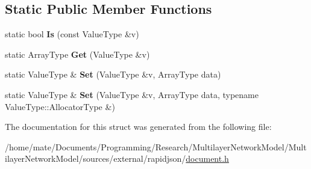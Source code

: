 \subsection*{Static Public Member Functions}
\begin{DoxyCompactItemize}
\item 
static bool {\bfseries Is} (const Value\+Type \&v)\hypertarget{structinternal_1_1TypeHelper_3_01ValueType_00_01typename_01ValueType_1_1Array_01_4_a2a052fc0139112075f8bade42964273d}{}\label{structinternal_1_1TypeHelper_3_01ValueType_00_01typename_01ValueType_1_1Array_01_4_a2a052fc0139112075f8bade42964273d}

\item 
static Array\+Type {\bfseries Get} (Value\+Type \&v)\hypertarget{structinternal_1_1TypeHelper_3_01ValueType_00_01typename_01ValueType_1_1Array_01_4_a0e6bd47ab5da0387bf419cdf644035ab}{}\label{structinternal_1_1TypeHelper_3_01ValueType_00_01typename_01ValueType_1_1Array_01_4_a0e6bd47ab5da0387bf419cdf644035ab}

\item 
static Value\+Type \& {\bfseries Set} (Value\+Type \&v, Array\+Type data)\hypertarget{structinternal_1_1TypeHelper_3_01ValueType_00_01typename_01ValueType_1_1Array_01_4_a7bab3fa93fb8bda16baf289e1d281315}{}\label{structinternal_1_1TypeHelper_3_01ValueType_00_01typename_01ValueType_1_1Array_01_4_a7bab3fa93fb8bda16baf289e1d281315}

\item 
static Value\+Type \& {\bfseries Set} (Value\+Type \&v, Array\+Type data, typename Value\+Type\+::\+Allocator\+Type \&)\hypertarget{structinternal_1_1TypeHelper_3_01ValueType_00_01typename_01ValueType_1_1Array_01_4_adba46e8947dcfecaeca5a5a5d8bb36cc}{}\label{structinternal_1_1TypeHelper_3_01ValueType_00_01typename_01ValueType_1_1Array_01_4_adba46e8947dcfecaeca5a5a5d8bb36cc}

\end{DoxyCompactItemize}


The documentation for this struct was generated from the following file\+:\begin{DoxyCompactItemize}
\item 
/home/mate/\+Documents/\+Programming/\+Research/\+Multilayer\+Network\+Model/\+Multilayer\+Network\+Model/sources/external/rapidjson/\hyperlink{document_8h}{document.\+h}\end{DoxyCompactItemize}
